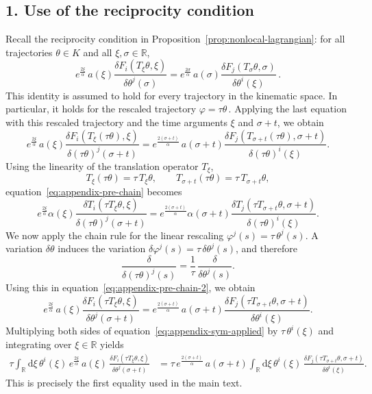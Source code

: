 \documentclass{article} %
\def\eqref#1{equation~\ref{#1}}
\begin{document}
\subsection*{1. Use of the reciprocity condition}
Recall the reciprocity condition in Proposition~\ref{prop:nonlocal-lagrangian}: for all trajectories
$\theta \in K$ and all $\xi,\sigma \in \mathbb{R}$,
\[
e^{\frac{2\xi}{\alpha}}\,a(\xi)
\frac{\delta F_i(T_\xi\theta, \xi)}{\delta \theta^j(\sigma)}
=
e^{\frac{2\sigma}{\alpha}}\,a(\sigma)
\frac{\delta F_j(T_\sigma\theta, \sigma)}{\delta \theta^i(\xi)}\,.
\]
This identity is assumed to hold for every trajectory in the kinematic space. In particular, it holds for the rescaled trajectory $\varphi = \tau \theta\,.$ Applying the last equation with this rescaled trajectory and the time arguments
$\xi$ and $\sigma + t$, we obtain
\begin{equation}
e^{\frac{2\xi}{\alpha}}\,a(\xi)
\frac{\delta F_i(T_\xi(\tau \theta), \xi)}{\delta (\tau\theta)^j(\sigma + t)}
=
e^{\frac{2(\sigma + t)}{\alpha}}\,a(\sigma + t)
\frac{\delta F_j(T_{\sigma + t}(\tau \theta), \sigma + t)}{\delta (\tau\theta)^i(\xi)}.
\label{eq:appendix-pre-chain}
\end{equation}
Using the linearity of the translation operator $T_\xi$,
\[
T_\xi(\tau\theta) = \tau\,T_\xi\theta, \qquad
T_{\sigma+t}(\tau\theta) = \tau\,T_{\sigma+t}\theta,
\]
\eqref{eq:appendix-pre-chain} becomes
\begin{equation}
e^{\frac{2\xi}{\alpha}} \alpha(\xi)
\frac{\delta T_i(\tau T_\xi\theta, \xi)}{\delta (\tau\theta)^j(\sigma + t)}
=
e^{\frac{2(\sigma + t)}{\alpha}} \alpha(\sigma + t)
\frac{\delta T_j(\tau T_{\sigma + t}\theta, \sigma + t)}{\delta (\tau\theta)^i(\xi)}.
\label{eq:appendix-pre-chain-2}
\end{equation}
We now apply the chain rule for the linear rescaling $\varphi^j(s) = \tau\,\theta^j(s)$. A variation $\delta\theta$ induces the variation $\delta\varphi^j(s) = \tau\,\delta\theta^j(s)$, and therefore
\[
\frac{\delta}{\delta(\tau\theta)^j(s)}
= \frac{1}{\tau}\,\frac{\delta}{\delta\theta^j(s)}.
\]
Using this in \eqref{eq:appendix-pre-chain-2}, we obtain
\begin{equation}
e^{\frac{2\xi}{\alpha}}\,a(\xi)
\frac{\delta F_i(\tau T_\xi\theta, \xi)}{\delta \theta^j(\sigma + t)}
=
e^{\frac{2(\sigma + t)}{\alpha}}\,a(\sigma + t)
\frac{\delta F_j(\tau T_{\sigma + t}\theta, \sigma + t)}{\delta \theta^i(\xi)}.
\label{eq:appendix-sym-applied}
\end{equation}
Multiplying both sides of \eqref{eq:appendix-sym-applied} by
$\tau\,\theta^i(\xi)$ and integrating over $\xi \in \mathbb{R}$ yields
\[
\begin{aligned}
 \tau \int_{\mathbb{R}} \mathrm{d}\xi \,
 \theta^i(\xi)\,e^{\frac{2\xi}{\alpha}}\,a(\xi)\,
 \frac{\delta F_i(\tau T_\xi\theta, \xi)}{\delta \theta^j(\sigma + t)}
 &=
 \tau\,e^{\frac{2(\sigma + t)}{\alpha}}\,a(\sigma + t)
 \int_{\mathbb{R}} \mathrm{d}\xi \,
 \theta^i(\xi)\,
 \frac{\delta F_j(\tau T_{\sigma + t} \theta,\sigma+t)}{\delta \theta^i(\xi)}.
\end{aligned}
\]
This is precisely the first equality used in the main text.
\end{document}
